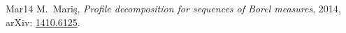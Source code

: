 \begin{thebibliography}{Mar14}
M.~Mari\c{s}, \emph{Profile decomposition for sequences of Borel measures}, 2014,
arXiv: \href{https://arxiv.org/abs/1410.6125}{1410.6125}.
\end{thebibliography}
